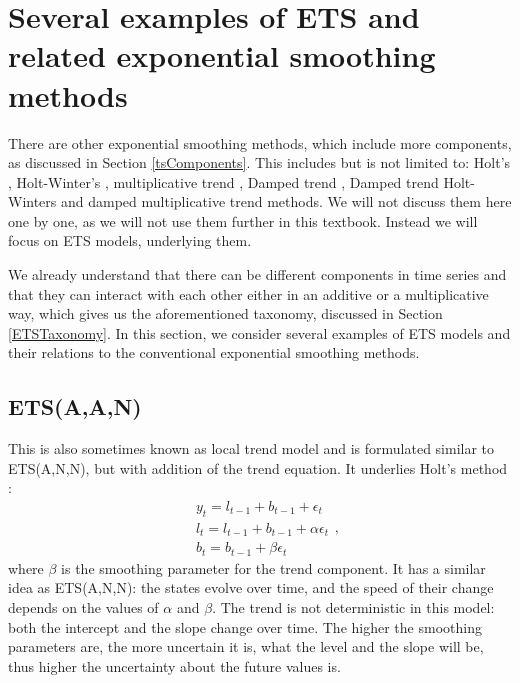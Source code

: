 \documentclass[
]{book}
\theoremstyle{definition}
\theoremstyle{definition}
\theoremstyle{definition}
\theoremstyle{definition}
\theoremstyle{remark}
\begin{document}
\hypertarget{ETSExamples}{%
\section{Several examples of ETS and related exponential smoothing methods}\label{ETSExamples}}

There are other exponential smoothing methods, which include more components, as discussed in Section \ref{tsComponents}. This includes but is not limited to: Holt's \citep[originally proposed in 1957]{Holt2004b}, Holt-Winter's \citep{Winters1960}, multiplicative trend \citep{Pegels1969}, Damped trend \citep[originally proposed by][ and then picked up by \citet{Gardner1985a}]{Roberts1982}, Damped trend Holt-Winters \citep{Gardner1989} and damped multiplicative trend \citep{Taylor2003} methods. We will not discuss them here one by one, as we will not use them further in this textbook. Instead we will focus on ETS models, underlying them.

We already understand that there can be different components in time series and that they can interact with each other either in an additive or a multiplicative way, which gives us the aforementioned taxonomy, discussed in Section \ref{ETSTaxonomy}. In this section, we consider several examples of ETS models and their relations to the conventional exponential smoothing methods.

\hypertarget{ETSAAN}{%
\subsection{ETS(A,A,N)}\label{ETSAAN}}

This is also sometimes known as local trend model and is formulated similar to ETS(A,N,N), but with addition of the trend equation. It underlies Holt's method \citep{Ord1997}:
\begin{equation}
  \begin{aligned}
    & y_{t} = l_{t-1} + b_{t-1} + \epsilon_t \\
    & l_t = l_{t-1} + b_{t-1} + \alpha \epsilon_t \\
    & b_t = b_{t-1} + \beta \epsilon_t
  \end{aligned} ,
  \label{eq:ETSAAN}
\end{equation}
where \(\beta\) is the smoothing parameter for the trend component. It has a similar idea as ETS(A,N,N): the states evolve over time, and the speed of their change depends on the values of \(\alpha\) and \(\beta\). The trend is not deterministic in this model: both the intercept and the slope change over time. The higher the smoothing parameters are, the more uncertain it is, what the level and the slope will be, thus higher the uncertainty about the future values is.
\end{document}
